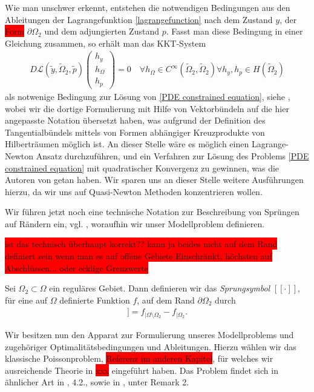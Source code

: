 Wie man unschwer erkennt, entstehen die notwendigen Bedingungen aus den Ableitungen der Lagrangefunktion \ref{lagrangefunction} nach dem Zustand $y$, der \colorbox{red}{Form} $\partial\Omega_2$ und dem adjungierten Zustand $p$. Fasst man diese Bedingung in einer Gleichung zusammen, so erhält man das KKT-System
\begin{align*}
	D\mathcal{L}(\tilde{y},\tilde{\Omega}_2,\tilde{p})\left(
	\begin{matrix}
	h_y \\
	h_{\Omega} \\
	h_p
	\end{matrix}\right)	 = 0 \quad \forall h_{\Omega} \in C^{\infty}(\tilde{\Omega}_2,\tilde{\Omega}_2)
	\forall h_y, h_p \in H(\tilde{\Omega}_2)
\end{align*}
als notwenige Bedingung zur Lösung von \ref{PDE constrained equation}, siehe \cite{LagrangeNewton}, wobei wir die dortige Formulierung mit Hilfe von Vektorbündeln auf die hier angepasste Notation übersetzt haben, was aufgrund der Definition des Tangentialbündels mittels von Formen abhängiger Kreuzprodukte von Hilberträumen  möglich ist. An dieser Stelle wäre es möglich einen Lagrange-Newton Ansatz durchzuführen, und ein Verfahren zur Lösung des Problems \ref{PDE constrained equation} mit quadratischer Konvergenz zu gewinnen, was die Autoren von \cite{LagrangeNewton} getan haben. Wir sparen uns an dieser Stelle weitere Ausführungen hierzu, da wir uns auf Quasi-Newton Methoden konzentrieren wollen.

Wir führen jetzt noch eine technische Notation zur Beschreibung von Sprüngen auf Rändern ein, vgl. \cite{LagrangeNewton}, woraufhin wir unser Modellproblem definieren.

\colorbox{red}{ist das technisch überhaupt korrekt?? kann ja beides nicht auf dem Rand definiert sein wenn man es auf offene Gebiete Einschränkt, höchsten auf Abschlüssen... oder ecklige Grenzwerte}
\begin{defi}
	Sei $\Omega_2 \subset \Omega$ ein reguläres Gebiet. Dann definieren wir das \textit{Sprungsymbol} $[[\cdot]]$, für eine auf $\Omega$ definierte Funktion $f$, auf dem Rand $\partial\Omega_2$ durch
	\begin{align*}
		[[f]] = f_{\vert \Omega \setminus \Omega_2} - f_{\vert \Omega_2}.
	\end{align*}
\end{defi}

Wir besitzen nun den Apparat zur Formulierung unseres Modellproblems und zugehöriger Optimalitätsbedingungen und Ableitungen. Hierzu wählen wir das klassische Poissonproblem, \colorbox{red}{Referenz im anderen Kapitel}, für welches wir ausreichende Theorie in \colorbox{red}{xxx} eingeführt haben. Das Problem findet sich in ähnlicher Art in \cite{shape_space}, 4.2., sowie in \cite{LagrangeNewton}, unter Remark 2.

